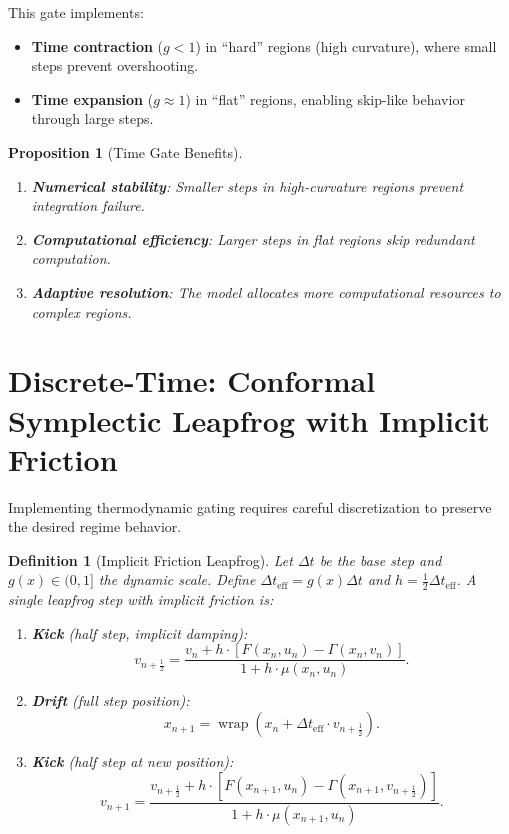 \documentclass[12pt,letterpaper,twoside]{article}
\newtheorem{definition}{Definition}[section]
\newtheorem{prop}{Proposition}[section]
\begin{document}
This gate implements:
\begin{itemize}
\item \textbf{Time contraction} ($g < 1$) in ``hard'' regions (high curvature), where small steps prevent overshooting.
\item \textbf{Time expansion} ($g \approx 1$) in ``flat'' regions, enabling skip-like behavior through large steps.
\end{itemize}

\begin{prop}[Time Gate Benefits]
\begin{enumerate}
\item \textbf{Numerical stability}: Smaller steps in high-curvature regions prevent integration failure.
\item \textbf{Computational efficiency}: Larger steps in flat regions skip redundant computation.
\item \textbf{Adaptive resolution}: The model allocates more computational resources to complex regions.
\end{enumerate}
\end{prop}

\section{Discrete-Time: Conformal Symplectic Leapfrog with Implicit Friction}

Implementing thermodynamic gating requires careful discretization to preserve the desired regime behavior.

\begin{definition}[Implicit Friction Leapfrog]
Let $\Delta t$ be the base step and $g(x) \in (0,1]$ the dynamic scale. Define $\Delta t_{\text{eff}} = g(x) \Delta t$ and $h = \frac{1}{2} \Delta t_{\text{eff}}$. A single leapfrog step with implicit friction is:

\begin{enumerate}
\item \textbf{Kick} (half step, implicit damping):
\[
v_{n+\frac{1}{2}} = \frac{v_n + h \cdot [F(x_n, u_n) - \Gamma(x_n, v_n)]}{1 + h \cdot \mu(x_n, u_n)}.
\]

\item \textbf{Drift} (full step position):
\[
x_{n+1} = \operatorname{wrap}\!\left(x_n + \Delta t_{\text{eff}} \cdot v_{n+\frac{1}{2}}\right).
\]

\item \textbf{Kick} (half step at new position):
\[
v_{n+1} = \frac{v_{n+\frac{1}{2}} + h \cdot [F(x_{n+1}, u_n) - \Gamma(x_{n+1}, v_{n+\frac{1}{2}})]}{1 + h \cdot \mu(x_{n+1}, u_n)}.
\]
\end{enumerate}
\end{definition}
\end{document}
